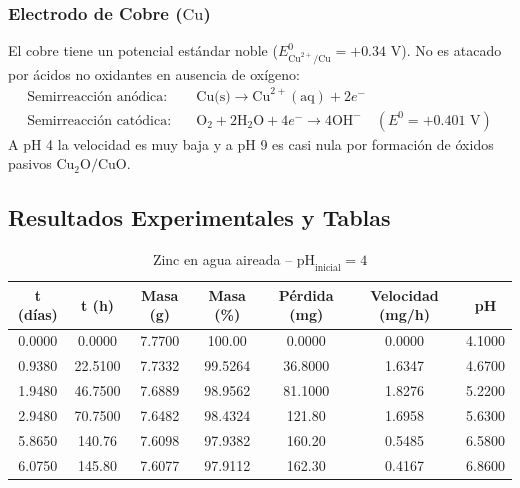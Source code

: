 \documentclass[11pt,a4paper]{article}
\begin{document}
\subsubsection{Electrodo de Cobre ($\text{Cu}$)}
El cobre tiene un potencial estándar noble ($E^0_{\text{Cu}^{2+}/\text{Cu}} = +0.34\text{ V}$). No es atacado por ácidos no oxidantes en ausencia de oxígeno:
\begin{align}
    \text{Semirreacción anódica:} \quad & \text{Cu(s)} \longrightarrow \text{Cu}^{2+}(\text{aq}) + 2e^- \\
    \text{Semirreacción catódica:} \quad & \text{O}_2 + 2\text{H}_2\text{O} + 4e^- \longrightarrow 4\text{OH}^- \quad (E^0 = +0.401\text{ V})
\end{align}
A pH 4 la velocidad es muy baja y a pH 9 es casi nula por formación de óxidos pasivos $\text{Cu}_2\text{O}/\text{CuO}$.

\subsection{Resultados Experimentales y Tablas}
\begin{table}[H]
\centering
\caption{Zinc en agua aireada -- $\text{pH}_{\text{inicial}} = 4$}
\label{tab:3_1_zn_ph4}
\begin{tabular}{ccccccc}
\toprule
t (días) & t (h) & Masa (g) & Masa (\%) & Pérdida (mg) & Velocidad (mg/h) & pH \\
\midrule
0.0000 & 0.0000 & 7.7700 & 100.00 & 0.0000 & 0.0000 & 4.1000 \\
0.9380 & 22.5100 & 7.7332 & 99.5264 & 36.8000 & 1.6347 & 4.6700 \\
1.9480 & 46.7500 & 7.6889 & 98.9562 & 81.1000 & 1.8276 & 5.2200 \\
2.9480 & 70.7500 & 7.6482 & 98.4324 & 121.80 & 1.6958 & 5.6300 \\
5.8650 & 140.76 & 7.6098 & 97.9382 & 160.20 & 0.5485 & 6.5800 \\
6.0750 & 145.80 & 7.6077 & 97.9112 & 162.30 & 0.4167 & 6.8600 \\
\bottomrule
\end{tabular}
\end{table}
\end{document}

